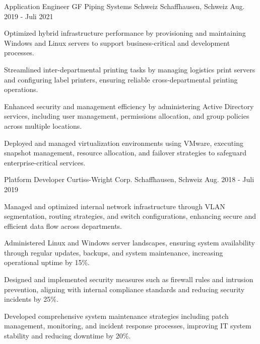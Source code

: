 \begin{cventries}
\cventry
  {Application Engineer}
  {GF Piping Systems Schweiz}
  {Schaffhausen, Schweiz}
  {Aug. 2019 - Juli 2021}
  {
    \begin{cvitems}
\item {Optimized hybrid infrastructure performance by provisioning and maintaining Windows and Linux servers to support business-critical and development processes.}
\item {Streamlined inter-departmental printing tasks by managing logistics print servers and configuring label printers, ensuring reliable cross-departmental printing operations.}
\item {Enhanced security and management efficiency by administering Active Directory services, including user management, permissions allocation, and group policies across multiple locations.}
\item {Deployed and managed virtualization environments using VMware, executing snapshot management, resource allocation, and failover strategies to safeguard enterprise-critical services.}
\end{cvitems}
  }

\cventry
  {Platform Developer}
  {Curtiss-Wright Corp.}
  {Schaffhausen, Schweiz}
  {Aug. 2018 - Juli 2019}
  {
    \begin{cvitems}
\item {Managed and optimized internal network infrastructure through VLAN segmentation, routing strategies, and switch configurations, enhancing secure and efficient data flow across departments.}
\item {Administered Linux and Windows server landscapes, ensuring system availability through regular updates, backups, and system maintenance, increasing operational uptime by 15\%.}
\item {Designed and implemented security measures such as firewall rules and intrusion prevention, aligning with internal compliance standards and reducing security incidents by 25\%.}
\item {Developed comprehensive system maintenance strategies including patch management, monitoring, and incident response processes, improving IT system stability and reducing downtime by 20\%.}
\end{cvitems}
  }


\end{cventries}
